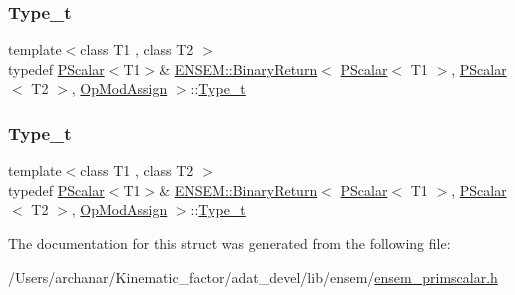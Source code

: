 \subsubsection{\texorpdfstring{Type\_t}{Type\_t}\hspace{0.1cm}{\footnotesize\ttfamily [1/2]}}
{\footnotesize\ttfamily template$<$class T1 , class T2 $>$ \\
typedef \mbox{\hyperlink{classENSEM_1_1PScalar}{P\+Scalar}}$<$T1$>$\& \mbox{\hyperlink{structENSEM_1_1BinaryReturn}{E\+N\+S\+E\+M\+::\+Binary\+Return}}$<$ \mbox{\hyperlink{classENSEM_1_1PScalar}{P\+Scalar}}$<$ T1 $>$, \mbox{\hyperlink{classENSEM_1_1PScalar}{P\+Scalar}}$<$ T2 $>$, \mbox{\hyperlink{structENSEM_1_1OpModAssign}{Op\+Mod\+Assign}} $>$\+::\mbox{\hyperlink{structENSEM_1_1BinaryReturn_3_01PScalar_3_01T1_01_4_00_01PScalar_3_01T2_01_4_00_01OpModAssign_01_4_a5881ef2b7460fedecc7cdf20e5f36799}{Type\+\_\+t}}}

\mbox{\label{structENSEM_1_1BinaryReturn_3_01PScalar_3_01T1_01_4_00_01PScalar_3_01T2_01_4_00_01OpModAssign_01_4_a5881ef2b7460fedecc7cdf20e5f36799}} 
\subsubsection{\texorpdfstring{Type\_t}{Type\_t}\hspace{0.1cm}{\footnotesize\ttfamily [2/2]}}
{\footnotesize\ttfamily template$<$class T1 , class T2 $>$ \\
typedef \mbox{\hyperlink{classENSEM_1_1PScalar}{P\+Scalar}}$<$T1$>$\& \mbox{\hyperlink{structENSEM_1_1BinaryReturn}{E\+N\+S\+E\+M\+::\+Binary\+Return}}$<$ \mbox{\hyperlink{classENSEM_1_1PScalar}{P\+Scalar}}$<$ T1 $>$, \mbox{\hyperlink{classENSEM_1_1PScalar}{P\+Scalar}}$<$ T2 $>$, \mbox{\hyperlink{structENSEM_1_1OpModAssign}{Op\+Mod\+Assign}} $>$\+::\mbox{\hyperlink{structENSEM_1_1BinaryReturn_3_01PScalar_3_01T1_01_4_00_01PScalar_3_01T2_01_4_00_01OpModAssign_01_4_a5881ef2b7460fedecc7cdf20e5f36799}{Type\+\_\+t}}}



The documentation for this struct was generated from the following file\+:\begin{DoxyCompactItemize}
\item 
/\+Users/archanar/\+Kinematic\+\_\+factor/adat\+\_\+devel/lib/ensem/\mbox{\hyperlink{lib_2ensem_2ensem__primscalar_8h}{ensem\+\_\+primscalar.\+h}}\end{DoxyCompactItemize}
